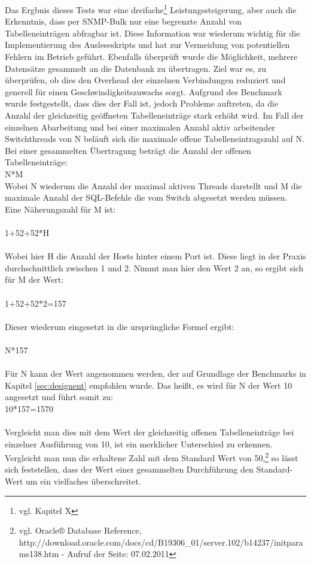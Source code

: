 Das Ergbnis dieses Tests war eine dreifache\footnote{vgl. Kapitel X} Leistungssteigerung, aber auch die Erkenntnis, dass per SNMP-Bulk nur eine begrenzte Anzahl von Tabelleneinträgen abfragbar ist. Diese Information war wiederum wichtig für die Implementierung des Ausleseskripts und hat zur Vermeidung von potentiellen Fehlern im Betrieb geführt. Ebenfalls überprüft wurde die Möglichkeit, mehrere Datensätze gesammelt an die Datenbank zu übertragen.
Ziel war es, zu überprüfen, ob dies den Overhead der einzelnen Verbindungen reduziert und generell für einen Geschwindigkeitszuwachs sorgt. Aufgrund des Benchmark wurde festgestellt, dass dies der Fall ist, jedoch Probleme auftreten, da die Anzahl der gleichzeitig geöffneten Tabelleneinträge stark erhöht wird. Im Fall der einzelnen Abarbeitung und bei einer maximalen Anzahl aktiv arbeitender Switchthreads von N beläuft sich die maximale offene Tabelleneintragszahl auf N.
\\ Bei einer gesammelten Übertragung beträgt die Anzahl der offenen Tabelleneinträge:\\
N*M\\
Wobei N wiederum die Anzahl der maximal aktiven Threads darstellt und M die maximale Anzahl der SQL-Befehle die vom Switch abgesetzt werden müssen. Eine Näherungszahl für M ist:\\
\\
1+52+52*H\\
\\
Wobei hier H die Anzahl der Hosts hinter einem Port ist. Diese liegt in der Praxis durchschnittlich zwischen 1 und 2. Nimmt man hier den Wert 2 an, so ergibt sich für M der Wert:\\
\\
1+52+52*2=157\\
\\
Dieser wiederum eingesetzt in die ursprüngliche Formel ergibt:\\
\\
N*157\\
\\
Für N kann der Wert angenommen werden, der auf Grundlage der Benchmarks in Kapitel \ref{sec:designent} empfohlen wurde.
Das heißt, es wird für N der Wert 10 angesetzt und führt somit zu:
\\
10*157=1570\\
\\
Vergleicht man dies mit dem Wert der gleichzeitig offenen Tabelleneinträge bei einzelner Ausführung von 10, ist ein merklicher Unterschied zu erkennen. Vergleicht man nun die erhaltene Zahl mit dem Standard Wert von 50,\footnote{vgl. Oracle® Database Reference, http://download.oracle.com/docs/cd/B19306\_01/server.102/b14237/initparams138.htm - Aufruf der Seite: 07.02.2011} so lässt sich feststellen, dass der Wert einer gesammelten Durchführung den Standard-Wert um ein vielfaches überschreitet.
